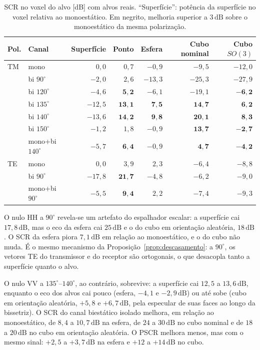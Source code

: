 \documentclass[12pt,a4paper,oneside]{book}
\theoremstyle{remark}
\newcommand{\dB}{\,\mathrm{dB}}
\theoremstyle{plain}
\theoremstyle{definition}
\begin{document}
\begin{table}[H]
\centering\small
\caption{SCR no voxel do alvo [dB] com alvos reais. ``Superfície'': potência da
superfície no voxel relativa ao monoestático. Em negrito, melhoria superior a
$3\dB$ sobre o monoestático da mesma polarização.}
\label{tab:sup_nulos_reais}
\begin{tabular}{@{}llrrrrr@{}}
\toprule
Pol. & Canal & Superfície & Ponto & Esfera & Cubo nominal & Cubo $SO(3)$ \\
\midrule
TM & mono & $0,0$ & $0,7$ & $-0,9$ & $-9,5$ & $-12,0$ \\
 & bi $90^\circ$ & $-2,0$ & $2,6$ & $-13,3$ & $-25,3$ & $-27,9$ \\
 & bi $120^\circ$ & $-4,6$ & $\mathbf{5,2}$ & $-6,1$ & $-19,1$ & $\mathbf{-6,2}$ \\
 & bi $135^\circ$ & $-12,5$ & $\mathbf{13,1}$ & $\mathbf{7,5}$ & $\mathbf{14,7}$ & $\mathbf{6,2}$ \\
 & bi $140^\circ$ & $-13,6$ & $\mathbf{14,2}$ & $\mathbf{9,8}$ & $\mathbf{20,1}$ & $\mathbf{8,3}$ \\
 & bi $150^\circ$ & $-1,2$ & $1,8$ & $-0,9$ & $\mathbf{13,7}$ & $\mathbf{-2,7}$ \\
 & mono+bi $140^\circ$ & $-5,7$ & $\mathbf{6,4}$ & $-0,9$ & $\mathbf{4,7}$ & $\mathbf{-4,2}$ \\
\midrule
TE & mono & $0,0$ & $3,9$ & $2,3$ & $-6,4$ & $-8,8$ \\
 & bi $90^\circ$ & $-17,8$ & $\mathbf{21,7}$ & $-4,8$ & $-6,2$ & $-9,0$ \\
 & mono+bi $90^\circ$ & $-5,5$ & $\mathbf{9,4}$ & $2,2$ & $-7,4$ & $-9,3$ \\
\bottomrule
\end{tabular}
\end{table}

O nulo HH a $90^\circ$ revela-se um artefato do espalhador escalar: a
superfície cai $17,8\dB$, mas o eco da esfera cai $25\dB$ e o do cubo em
orientação aleatória, $18\dB$. O SCR da esfera piora $7,1\dB$ em relação ao
monoestático, e o do cubo não muda. É o mesmo mecanismo da
Proposição~\ref{prop:descasamento}: a $90^\circ$, os vetores TE do transmissor e
do receptor são ortogonais, o que desacopla tanto a superfície quanto o alvo.

O nulo VV a $135^\circ$--$140^\circ$, ao contrário, sobrevive: a superfície cai $12,5$ a
$13,6\dB$, enquanto o eco dos alvos cai pouco (esfera, $-4,1$ e $-2,9\dB$) ou até
sobe (cubo em orientação aleatória, $+5,8$ e $+6,7\dB$, pela especular de suas
faces ao longo da bissetriz). O SCR do canal biestático isolado melhora, em
relação ao monoestático, de $8,4$ a $10,7\dB$ na esfera, de $24$ a $30\dB$ no cubo
nominal e de $18$ a $20\dB$ no cubo em orientação aleatória. O PSCR melhora menos,
mas com o mesmo sinal: $+2,5$ a $+3,7\dB$ na esfera e $+12$ a $+14\dB$ no cubo.
\end{document}
